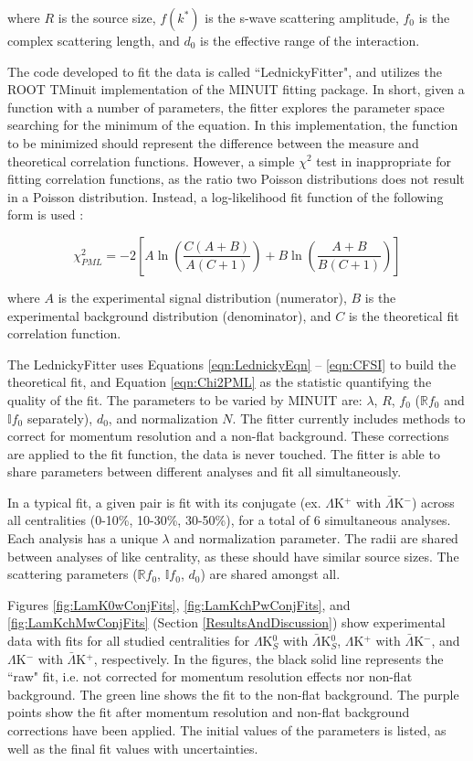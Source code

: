 \documentclass[../AnalysisNoteJBuxton.tex]{subfiles}
\begin{document}
where $R$ is the source size, $f(k^{*})$ is the s-wave scattering amplitude, $f_{0}$ is the complex scattering length, and $d_{0}$ is the effective range of the interaction.

The code developed to fit the data is called ``LednickyFitter", and utilizes the ROOT TMinuit implementation of the MINUIT fitting package.
In short, given a function with a number of parameters, the fitter explores the parameter space searching for the minimum of the equation.
In this implementation, the function to be minimized should represent the difference between the measure and theoretical correlation functions.
However, a simple $\chi^{2}$ test in inappropriate for fitting correlation functions, as the ratio two Poisson distributions does not result in a Poisson distribution.
Instead, a log-likelihood fit function of the following form is used \cite{Lisa:2005dd}:

\begin{equation}
 \chi^{2}_{PML} = -2\left[A\ln\left(\frac{C(A+B)}{A(C+1)}\right) + B\ln\left(\frac{A+B}{B(C+1)}\right)\right]
\label{eqn:Chi2PML}
\end{equation}

where $A$ is the experimental signal distribution (numerator), $B$ is the experimental background distribution (denominator), and $C$ is the theoretical fit correlation function.

The LednickyFitter uses Equations \ref{eqn:LednickyEqn} -- \ref{eqn:CFSI} to build the theoretical fit, and Equation \ref{eqn:Chi2PML} as the statistic quantifying the quality of the fit.
The parameters to be varied by MINUIT are: $\lambda$, $R$, $f_{0}$ ($\mathbb{R}f_{0}$ and $\mathbb{I}f_{0}$ separately), $d_{0}$, and normalization $N$.
The fitter currently includes methods to correct for momentum resolution and a non-flat background.
These corrections are applied to the fit function, the data is never touched.
The fitter is able to share parameters between different analyses and fit all simultaneously.  

In a typical fit, a given pair is fit with its conjugate (ex. $\Lambda$K$^{+}$ with $\bar{\Lambda}$K$^{-}$) across all centralities (0-10\%, 10-30\%, 30-50\%), for a total of 6 simultaneous analyses.
Each analysis has a unique $\lambda$ and normalization parameter.
The radii are shared between analyses of like centrality, as these should have similar source sizes.
The scattering parameters ($\mathbb{R}f_{0}$, $\mathbb{I}f_{0}$, $d_{0}$) are shared amongst all.

Figures \ref{fig:LamK0wConjFits}, \ref{fig:LamKchPwConjFits}, and \ref{fig:LamKchMwConjFits} (Section \ref{ResultsAndDiscussion}) show experimental data with fits for all studied centralities for $\Lambda$K$^{0}_{S}$ with $\bar{\Lambda}$K$^{0}_{S}$, $\Lambda$K$^{+}$ with $\bar{\Lambda}$K$^{-}$, and $\Lambda$K$^{-}$ with $\bar{\Lambda}$K$^{+}$, respectively.  In the figures, the black solid line represents the ``raw" fit, i.e. not corrected for momentum resolution effects nor non-flat background.  The green line shows the fit to the non-flat background.  The purple points show the fit after momentum resolution and non-flat background corrections have been applied.  The initial values of the parameters is listed, as well as the final fit values with uncertainties.
\end{document}
